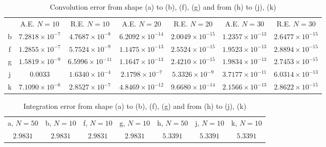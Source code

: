 \documentclass[11pt, a4paper]{article}
\theoremstyle{definition}
\begin{document}
\begin{table}
	\caption{Convolution error from shape (a) to (b), (f), (g) and from (h) to (j), (k)}
	\begin{tabular}{ ||c| c| c| c| c |c|c|| }
		\hline
		\hline
		& A.E. $N =10$ & R.E. $N =10$ &A.E. $N =20$ & R.E. $N =20$ &A.E. $N =30$ & R.E. $N =30$ \\ 
		b& $ 7.2818\times 10^{- 7}$ & $ 4.7687\times 10^{-8}$ & $ 6.2092\times 10^{- 14}$ & $2.0049\times 10^{-15 }$ &$ 1.2357\times 10^{-13 }$ & $2.6477\times 10^{- 15}$ \\
		f& $ 1.2855\times 10^{-7}$ & $ 5.7524\times 10^{- 9}$ & $ 1.1475\times 10^{-13 }$ & $ 2.5524\times 10^{-15 }$ &$ 1.9523\times 10^{-13 }$ & $ 2.8894\times 10^{-15 }$ \\
		g& $ 1.5819 \times 10^{-9 }$ & $ 6.5996\times 10^{-11 }$ & $ 1.1647\times 10^{-13 }$ & $ 2.4210\times 10^{-15 }$ &$ 1.9834\times 10^{-13 }$ & $2.7453 \times 10^{- 15}$ \\
		\hline
		j& $  0.0033$ & $ 1.6340 \times 10^{-4 }$ & $ 2.1798\times 10^{- 7}$ & $5.3326 \times 10^{- 9}$ &$3.7177 \times 10^{- 11}$ & $ 6.0314\times 10^{- 13}$ \\
		k& $ 7.1090\times 10^{-6 }$ & $2.8527 \times 10^{-7 }$ & $ 4.8469\times 10^{- 12}$ & $9.6680\times 10^{-14 }$ &$ 2.1566\times 10^{- 13}$ & $2.8622 \times 10^{- 15}$ \\
		\hline
	\end{tabular}
	\label{Tab:conv}
\end{table}



\begin{table}
	\caption{Integration error from shape (a) to (b), (f), (g) and from (h) to (j), (k)}
	\begin{tabular}{ || c| c| c| c| c| c| c||| }
		\hline
		\hline
		a, $N =50$ & b, $N =10$& f, $N =10$ & g, $N =10$& h, $N =50$& j, $N =10$& k, $N =10$\\ 
		 $ 2.9831$ & $2.9831 $ & $2.9831 $ &$2.9831 $ & $5.3391 $ & $5.3391$ &  $5.3391 $  \\

		\hline
	\end{tabular}
	\label{Tab:int}
\end{table}
\end{document}

